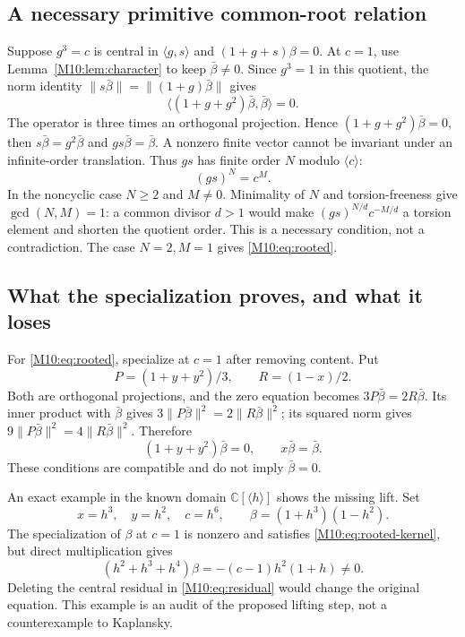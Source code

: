 \documentclass[11pt,a4paper,oneside]{report}
\theoremstyle{definition}
\theoremstyle{remark}
\newcommand{\C}{\mathbb C}
\begin{document}
\subsection{A necessary primitive common-root relation}
Suppose $g^3=c$ is central in $\langle g,s\rangle$ and
$(1+g+s)\beta=0$. At $c=1$, use Lemma~\ref{M10:lem:character}
to keep $\bar\beta\ne0$. Since $g^3=1$ in this quotient,
the norm identity $\|s\bar\beta\|=\|(1+g)\bar\beta\|$ gives
\[
\langle(1+g+g^2)\bar\beta,\bar\beta\rangle=0.
\]
The operator is three times an orthogonal projection. Hence
$(1+g+g^2)\bar\beta=0$, then $s\bar\beta=g^2\bar\beta$ and
$gs\bar\beta=\bar\beta$. A nonzero finite vector cannot be
invariant under an infinite-order translation. Thus $gs$ has
finite order $N$ modulo $\langle c\rangle$:
\[
(gs)^N=c^M.
\]
In the noncyclic case $N\ge2$ and $M\ne0$. Minimality of $N$
and torsion-freeness give $\gcd(N,M)=1$: a common divisor
$d>1$ would make $(gs)^{N/d}c^{-M/d}$ a torsion element and
shorten the quotient order. This is a necessary condition, not a
contradiction. The case $N=2,M=1$ gives \eqref{M10:eq:rooted}.

\subsection{What the specialization proves, and what it loses}
For \eqref{M10:eq:rooted}, specialize at $c=1$ after removing content.
Put
\[
P=(1+y+y^2)/3,\qquad R=(1-x)/2.
\]
Both are orthogonal projections, and the zero equation becomes
$3P\bar\beta=2R\bar\beta$. Its inner product with $\bar\beta$
gives $3\|P\bar\beta\|^2=2\|R\bar\beta\|^2$; its squared norm
gives $9\|P\bar\beta\|^2=4\|R\bar\beta\|^2$. Therefore
\begin{equation}\label{M10:eq:rooted-kernel}
(1+y+y^2)\bar\beta=0,\qquad x\bar\beta=\bar\beta.
\end{equation}
These conditions are compatible and do not imply $\bar\beta=0$.

An exact example in the known domain $\C[\langle h\rangle]$
shows the missing lift. Set
\[
x=h^3,\quad y=h^2,\quad c=h^6,\qquad
\beta=(1+h^3)(1-h^2).
\]
The specialization of $\beta$ at $c=1$ is nonzero and satisfies
\eqref{M10:eq:rooted-kernel}, but direct multiplication gives
\begin{equation}\label{M10:eq:residual}
(h^2+h^3+h^4)\beta=-(c-1)h^2(1+h)\ne0.
\end{equation}
Deleting the central residual in \eqref{M10:eq:residual} would change
the original equation. This example is an audit of the proposed
lifting step, not a counterexample to Kaplansky.
\end{document}
